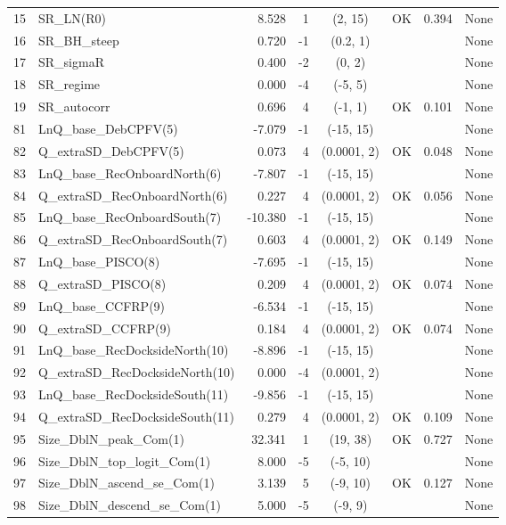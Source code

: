 \documentclass[12pt,]{article}
\begin{document}
\begin{landscape}
\begin{longtable}{rlrrcccl}
  15 & SR\_LN(R0) & 8.528 & 1 & (2, 15) & OK & 0.394 & None \\ 
  16 & SR\_BH\_steep & 0.720 & -1 & (0.2, 1) &  &  & None \\ 
  17 & SR\_sigmaR & 0.400 & -2 & (0, 2) &  &  & None \\ 
  18 & SR\_regime & 0.000 & -4 & (-5, 5) &  &  & None \\ 
  19 & SR\_autocorr & 0.696 & 4 & (-1, 1) & OK & 0.101 & None \\ 
  81 & LnQ\_base\_DebCPFV(5) & -7.079 & -1 & (-15, 15) &  &  & None \\ 
  82 & Q\_extraSD\_DebCPFV(5) & 0.073 & 4 & (0.0001, 2) & OK & 0.048 & None \\ 
  83 & LnQ\_base\_RecOnboardNorth(6) & -7.807 & -1 & (-15, 15) &  &  & None \\ 
  84 & Q\_extraSD\_RecOnboardNorth(6) & 0.227 & 4 & (0.0001, 2) & OK & 0.056 & None \\ 
  85 & LnQ\_base\_RecOnboardSouth(7) & -10.380 & -1 & (-15, 15) &  &  & None \\ 
  86 & Q\_extraSD\_RecOnboardSouth(7) & 0.603 & 4 & (0.0001, 2) & OK & 0.149 & None \\ 
  87 & LnQ\_base\_PISCO(8) & -7.695 & -1 & (-15, 15) &  &  & None \\ 
  88 & Q\_extraSD\_PISCO(8) & 0.209 & 4 & (0.0001, 2) & OK & 0.074 & None \\ 
  89 & LnQ\_base\_CCFRP(9) & -6.534 & -1 & (-15, 15) &  &  & None \\ 
  90 & Q\_extraSD\_CCFRP(9) & 0.184 & 4 & (0.0001, 2) & OK & 0.074 & None \\ 
  91 & LnQ\_base\_RecDocksideNorth(10) & -8.896 & -1 & (-15, 15) &  &  & None \\ 
  92 & Q\_extraSD\_RecDocksideNorth(10) & 0.000 & -4 & (0.0001, 2) &  &  & None \\ 
  93 & LnQ\_base\_RecDocksideSouth(11) & -9.856 & -1 & (-15, 15) &  &  & None \\ 
  94 & Q\_extraSD\_RecDocksideSouth(11) & 0.279 & 4 & (0.0001, 2) & OK & 0.109 & None \\ 
  95 & Size\_DblN\_peak\_Com(1) & 32.341 & 1 & (19, 38) & OK & 0.727 & None \\ 
  96 & Size\_DblN\_top\_logit\_Com(1) & 8.000 & -5 & (-5, 10) &  &  & None \\ 
  97 & Size\_DblN\_ascend\_se\_Com(1) & 3.139 & 5 & (-9, 10) & OK & 0.127 & None \\ 
  98 & Size\_DblN\_descend\_se\_Com(1) & 5.000 & -5 & (-9, 9) &  &  & None \\ 

\end{longtable}
\end{landscape}
\end{document}
